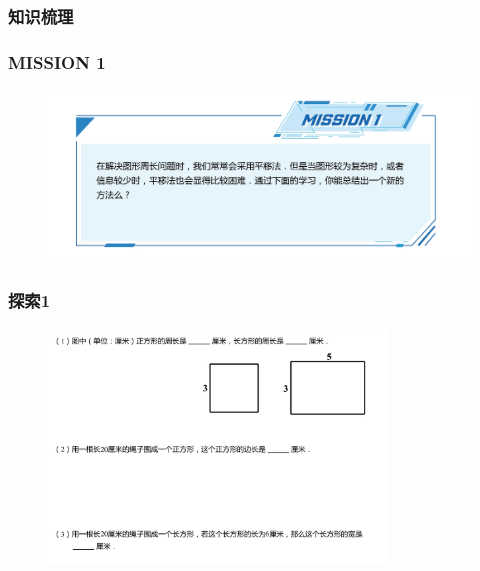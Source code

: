 \begin{frame}
    \frametitle{知识梳理}
\end{frame}

\begin{frame}
    \frametitle{MISSION 1}
    \begin{figure}[H] 
        \centering
        \includegraphics[width=1\textwidth]{./pics/Chapter_1/mission1.png}
    \end{figure}
\end{frame}

\begin{frame}
    \frametitle{探索1}
    \begin{figure}[H] 
        \centering
        \includegraphics[width=0.8\textwidth]{./pics/Chapter_1/tansuo1.png}
    \end{figure}
\end{frame}

